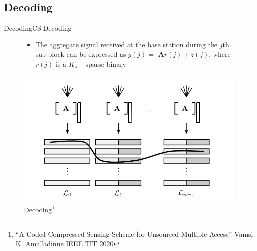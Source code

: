 \documentclass[aspectratio=169, handout, 10pt, hyperref=colorlinks]{beamer}
\begin{document}
\subsection{Decoding} 
\begin{frame}{Decoding}{CS Decoding}
    \begin{figure}
        \begin{minipage}{0.5\linewidth}
            \begin{itemize}
                \item 
                The aggregate signal received at the base station during the $j$th sub-block can be expressed as $y(j)=$ $\mathbf{A}r(j)+z(j)$, where $r(j) $ is a $K_\text{a}-$sparse binary
                
                
            \end{itemize}
        \end{minipage}%
        \begin{minipage}{0.5\linewidth}
            \centering
            \includegraphics[width=\linewidth]{images_CCS/fig3.png}
            \caption{Decoding\footnote{``A Coded Compressed Sensing Scheme for Unsourced Multiple Access'' Vamsi K. Amalladinne IEEE TIT 2020}}
            \label{fig:dataset}
        \end{minipage}
    \end{figure}
\end{frame}
 
\end{document}
